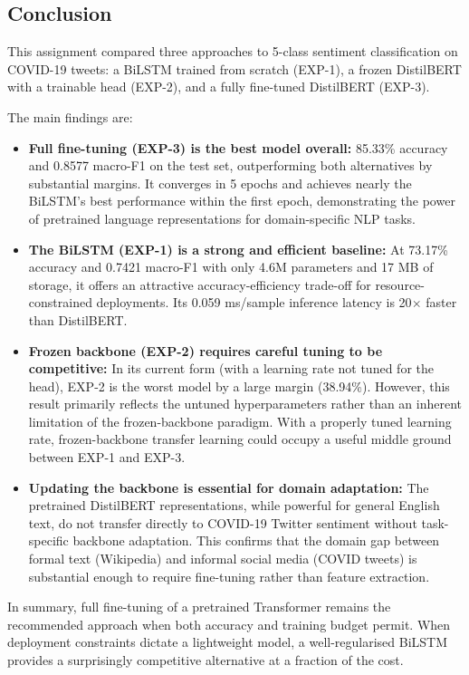 \subsection{Conclusion}

This assignment compared three approaches to 5-class sentiment classification on COVID-19 tweets: a BiLSTM trained from scratch (EXP-1), a frozen DistilBERT with a trainable head (EXP-2), and a fully fine-tuned DistilBERT (EXP-3).

The main findings are:

\begin{itemize}
    \item \textbf{Full fine-tuning (EXP-3) is the best model overall:} 85.33\% accuracy and 0.8577 macro-F1 on the test set, outperforming both alternatives by substantial margins. It converges in 5 epochs and achieves nearly the BiLSTM's best performance within the first epoch, demonstrating the power of pretrained language representations for domain-specific NLP tasks.

    \item \textbf{The BiLSTM (EXP-1) is a strong and efficient baseline:} At 73.17\% accuracy and 0.7421 macro-F1 with only 4.6M parameters and 17 MB of storage, it offers an attractive accuracy-efficiency trade-off for resource-constrained deployments. Its 0.059 ms/sample inference latency is 20$\times$ faster than DistilBERT.

    \item \textbf{Frozen backbone (EXP-2) requires careful tuning to be competitive:} In its current form (with a learning rate not tuned for the head), EXP-2 is the worst model by a large margin (38.94\%). However, this result primarily reflects the untuned hyperparameters rather than an inherent limitation of the frozen-backbone paradigm. With a properly tuned learning rate, frozen-backbone transfer learning could occupy a useful middle ground between EXP-1 and EXP-3.

    \item \textbf{Updating the backbone is essential for domain adaptation:} The pretrained DistilBERT representations, while powerful for general English text, do not transfer directly to COVID-19 Twitter sentiment without task-specific backbone adaptation. This confirms that the domain gap between formal text (Wikipedia) and informal social media (COVID tweets) is substantial enough to require fine-tuning rather than feature extraction.
\end{itemize}

In summary, full fine-tuning of a pretrained Transformer remains the recommended approach when both accuracy and training budget permit. When deployment constraints dictate a lightweight model, a well-regularised BiLSTM provides a surprisingly competitive alternative at a fraction of the cost.
